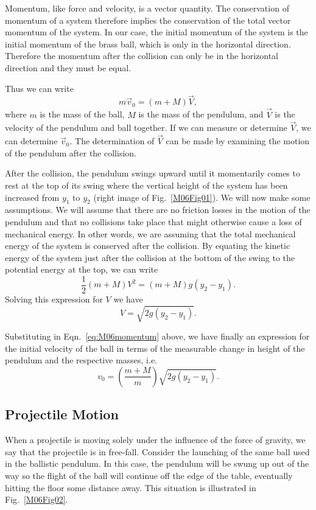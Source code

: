 Momentum, like force and velocity, is a vector quantity.  The conservation of momentum of a system therefore implies the conservation of the total vector momentum of the system.  In our case, the initial momentum of the system is the initial momentum of the brass ball, which is only in the horizontal direction.  Therefore the momentum after the collision can only be in the horizontal direction and they must be equal.

Thus we can write
\begin{equation}
  \label{eq:M06momentum}
  m \vec{v}_0 = (m + M) \vec{V},
\end{equation}
where $m$ is the mass of the ball, $M$ is the mass of the pendulum, and $\vec{V}$ is the velocity of the pendulum and ball together.  If we can measure or determine $\vec{V}$, we can determine $\vec{v}_0$.  The determination of $\vec{V}$ can be made by examining the motion of the pendulum after the collision.

After the collision, the pendulum swings upward until it momentarily comes to rest at the top of its swing where the vertical height of the system has been increased from $y_1$ to $y_2$ (right image of Fig.~\ref{M06Fig01}).  We will now make some assumptions.  We will assume that there are no friction losses in the motion of the pendulum and that no collisions take place that might otherwise cause a loss of mechanical energy.  In other words, we are assuming that the total mechanical energy of the system is conserved after the collision.  By equating the kinetic energy of the system just after the collision at the bottom of the swing to the potential energy at the top, we can write
\[
\frac{1}{2}(m+M) V^2 = (m+M)  g \left(y_2 - y_1\right).
\]
Solving this expression for $V$ we have
\[
V = \sqrt{2 g \left(y_2 - y_1\right)}.
\]

Substituting in Eqn.~\ref{eq:M06momentum} above, we have finally an expression for the initial velocity of the ball in terms of the measurable change in height of the pendulum and the respective masses, i.e.
\begin{equation}
  \label{eq:M06v0} 
  v_0 = \left( \frac{m+M}{m} \right) \sqrt{2 g \left(y_2 - y_1\right)}.
\end{equation}

\subsection{Projectile Motion}

When a projectile is moving solely under the influence of the force of gravity, we say that the projectile is in free-fall.  Consider the launching of the same ball used in the ballistic pendulum.  In this case, the pendulum will be swung up out of the way so the flight of the ball will continue off the edge of the table, eventually hitting the floor some distance away.  This situation is illustrated in Fig.~\ref{M06Fig02}.

